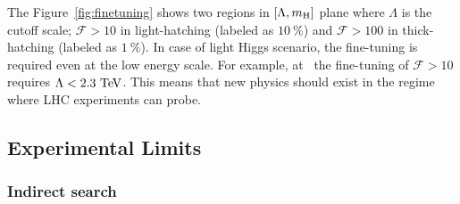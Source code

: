 The Figure~\ref{fig:finetuning} \cite{Kolda:2000wi} shows two regions in $[\Lambda,m_{\mathrm{H}}]$ plane
where $\Lambda$ is the cutoff scale; 
$\mathcal{F}>10$ in light-hatching (labeled as $10~\%$)
and $\mathcal{F}>100$ in thick-hatching (labeled as $1~\%$).  
In case of light Higgs scenario, the fine-tuning is required even at the low energy scale. 
For example, at  \GeV\ the fine-tuning of $\mathcal{F}>10$ requires 
$\Lambda<2.3~\mathrm{Te\kern -0.1em V}$. This means that new physics should exist in the regime where 
LHC experiments can probe.

\newpage
\subsection{Experimental Limits} 

%
\subsubsection{Indirect search} 

